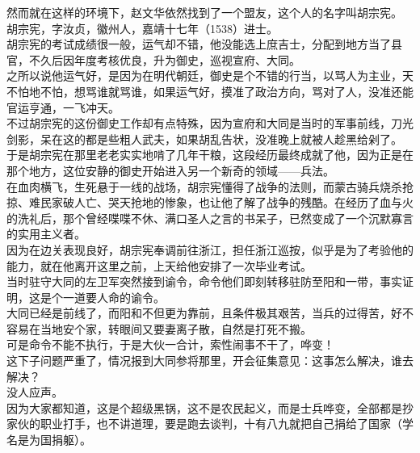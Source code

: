 \begin{multicols}{\theparacolNo}
然而就在这样的环境下，赵文华依然找到了一个盟友，这个人的名字叫胡宗宪。\\

胡宗宪，字汝贞，徽州人，嘉靖十七年（1538）进士。\\

胡宗宪的考试成绩很一般，运气却不错，他没能选上庶吉士，分配到地方当了县官，不久后因年度考核优良，升为御史，巡视宣府、大同。\\

之所以说他运气好，是因为在明代朝廷，御史是个不错的行当，以骂人为主业，天不怕地不怕，想骂谁就骂谁，如果运气好，摸准了政治方向，骂对了人，没准还能官运亨通，一飞冲天。\\

不过胡宗宪的这份御史工作却有点特殊，因为宣府和大同是当时的军事前线，刀光剑影，呆在这的都是些粗人武夫，如果胡乱告状，没准晚上就被人趁黑给剁了。\\

于是胡宗宪在那里老老实实地啃了几年干粮，这段经历最终成就了他，因为正是在那个地方，这位安静的御史开始进入另一个新奇的领域——兵法。\\

在血肉横飞，生死悬于一线的战场，胡宗宪懂得了战争的法则，而蒙古骑兵烧杀抢掠、难民家破人亡、哭天抢地的惨象，也让他了解了战争的残酷。在经历了血与火的洗礼后，那个曾经喋喋不休、满口圣人之言的书呆子，已然变成了一个沉默寡言的实用主义者。\\

因为在边关表现良好，胡宗宪奉调前往浙江，担任浙江巡按，似乎是为了考验他的能力，就在他离开这里之前，上天给他安排了一次毕业考试。\\

当时驻守大同的左卫军突然接到谕令，命令他们即刻转移驻防至阳和一带，事实证明，这是个一道要人命的谕令。\\

大同已经是前线了，而阳和不但更为靠前，且条件极其艰苦，当兵的过得苦，好不容易在当地安个家，转眼间又要妻离子散，自然是打死不搬。\\

可是命令不能不执行，于是大伙一合计，索性闹事不干了，哗变！\\

这下子问题严重了，情况报到大同参将那里，开会征集意见：这事怎么解决，谁去解决？\\

没人应声。\\

因为大家都知道，这是个超级黑锅，这不是农民起义，而是士兵哗变，全部都是抄家伙的职业打手，也不讲道理，要是跑去谈判，十有八九就把自己捐给了国家（学名是为国捐躯）。\\


\end{multicols}
